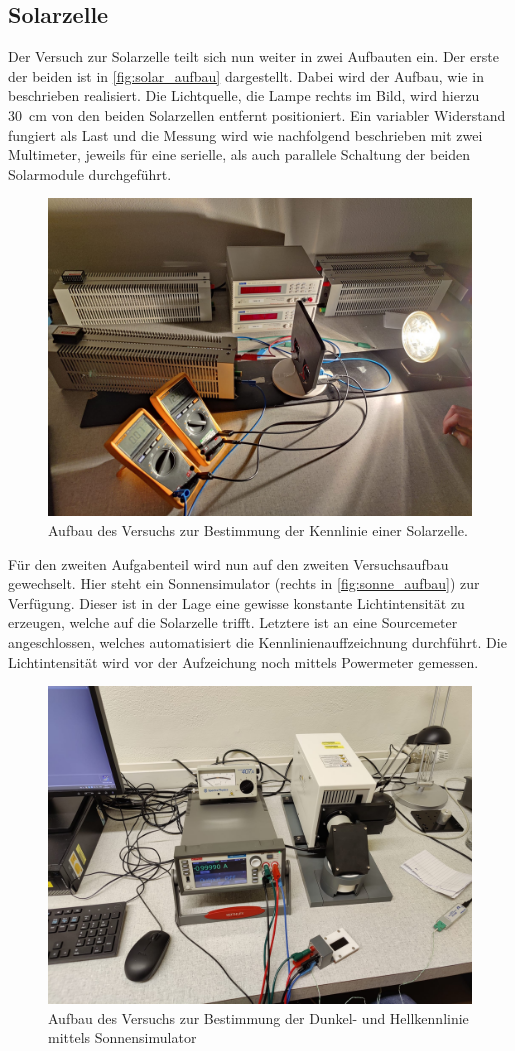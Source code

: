 \documentclass[english, ngerman]{scrartcl}
\begin{document}
\subsection{Solarzelle}
\label{subsec:solarzelle}
Der Versuch zur Solarzelle teilt sich nun weiter in zwei Aufbauten ein. Der erste der beiden ist in \autoref{fig:solar_aufbau} dargestellt. Dabei wird der Aufbau, wie in \cite{ref:angabe_solar} beschrieben realisiert. Die Lichtquelle, die Lampe rechts im Bild, wird hierzu \SI{30}{cm} von den beiden Solarzellen entfernt positioniert. Ein variabler Widerstand fungiert als Last und die Messung wird wie nachfolgend beschrieben mit zwei Multimeter, jeweils für eine serielle, als auch parallele Schaltung der beiden Solarmodule durchgeführt. 
\begin{figure}
    \centering
    \begin{samepage}
        \includegraphics[width=0.6\linewidth]{fig/Aufbau_solar.jpeg}
        \caption{Aufbau des Versuchs zur Bestimmung der Kennlinie einer Solarzelle.}
        \label{fig:solar_aufbau}
    \end{samepage}
\end{figure}
Für den zweiten Aufgabenteil wird nun auf den zweiten Versuchsaufbau gewechselt. Hier steht ein Sonnensimulator (rechts in \autoref{fig:sonne_aufbau}) zur Verfügung.  Dieser ist in der Lage eine gewisse konstante Lichtintensität zu erzeugen, welche auf die Solarzelle trifft. Letztere ist an eine Sourcemeter angeschlossen, welches automatisiert die Kennlinienauffzeichnung durchführt. Die Lichtintensität wird vor der Aufzeichung noch mittels Powermeter gemessen.
\begin{figure}
    \centering
    \begin{samepage}
        \includegraphics[width=0.6\linewidth]{fig/Aufbau_Sonnensimulator.jpeg}
        \caption{Aufbau des Versuchs zur Bestimmung der Dunkel- und Hellkennlinie mittels Sonnensimulator}
        \label{fig:sonne_aufbau}
    \end{samepage}
\end{figure}
\end{document}
